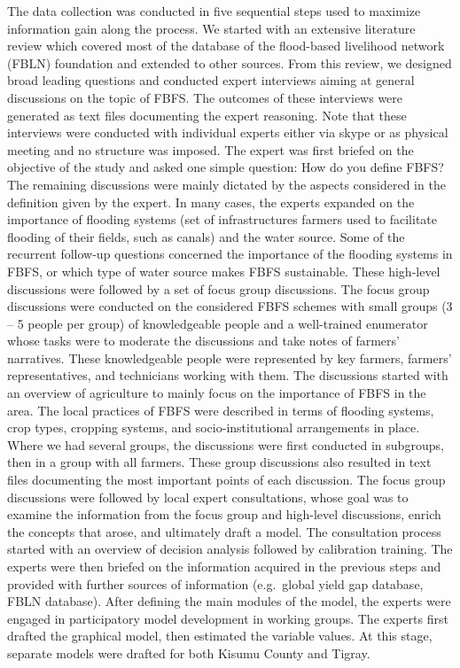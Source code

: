 \documentclass[]{elsarticle} %
\begin{document}
The data collection was conducted in five sequential steps used to maximize information gain along the process. We started with an extensive literature review which covered most of the database of the flood-based livelihood network (FBLN) foundation and extended to other sources. From this review, we designed broad leading questions and conducted expert interviews aiming at general discussions on the topic of FBFS. The outcomes of these interviews were generated as text files documenting the expert reasoning. Note that these interviews were conducted with individual experts either via skype or as physical meeting and no structure was imposed. The expert was first briefed on the objective of the study and asked one simple question: How do you define FBFS? The remaining discussions were mainly dictated by the aspects considered in the definition given by the expert. In many cases, the experts expanded on the importance of flooding systems (set of infrastructures farmers used to facilitate flooding of their fields, such as canals) and the water source. Some of the recurrent follow-up questions concerned the importance of the flooding systems in FBFS, or which type of water source makes FBFS sustainable. These high-level discussions were followed by a set of focus group discussions.
The focus group discussions were conducted on the considered FBFS schemes with small groups (3 -- 5 people per group) of knowledgeable people and a well-trained enumerator whose tasks were to moderate the discussions and take notes of farmers' narratives. These knowledgeable people were represented by key farmers, farmers' representatives, and technicians working with them. The discussions started with an overview of agriculture to mainly focus on the importance of FBFS in the area. The local practices of FBFS were described in terms of flooding systems, crop types, cropping systems, and socio-institutional arrangements in place. Where we had several groups, the discussions were first conducted in subgroups, then in a group with all farmers. These group discussions also resulted in text files documenting the most important points of each discussion.
The focus group discussions were followed by local expert consultations, whose goal was to examine the information from the focus group and high-level discussions, enrich the concepts that arose, and ultimately draft a model. The consultation process started with an overview of decision analysis followed by calibration training. The experts were then briefed on the information acquired in the previous steps and provided with further sources of information (e.g.~global yield gap database, FBLN database). After defining the main modules of the model, the experts were engaged in participatory model development in working groups. The experts first drafted the graphical model, then estimated the variable values. At this stage, separate models were drafted for both Kisumu County and Tigray.
\end{document}
